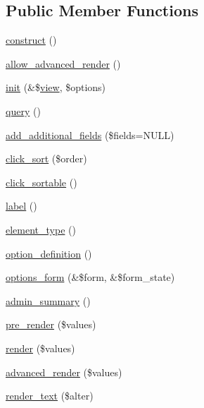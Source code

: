 \subsection*{Public Member Functions}
\begin{CompactItemize}
\item 
\hyperlink{classviews__handler__field_3d50050864c255b71c842972a45d39f6}{construct} ()
\item 
\hyperlink{classviews__handler__field_cdeb45612be43c2d58814726b35e55aa}{allow\_\-advanced\_\-render} ()
\item 
\hyperlink{classviews__handler__field_7eaaf0fd6fbc57c2955f88b257394d19}{init} (\&\$\hyperlink{classview}{view}, \$options)
\item 
\hyperlink{classviews__handler__field_4f661f91bcbe80d4a00c30a31456c502}{query} ()
\item 
\hyperlink{classviews__handler__field_1590869371ef24a211e591a07ed5f7cb}{add\_\-additional\_\-fields} (\$fields=NULL)
\item 
\hyperlink{classviews__handler__field_1c8cabe835ba05ed045c8f6eec6a36b8}{click\_\-sort} (\$order)
\item 
\hyperlink{classviews__handler__field_22ef16d2b34823a3d12f273d34278b00}{click\_\-sortable} ()
\item 
\hyperlink{classviews__handler__field_57c9be8a5a6a5f447c0320bf1a5378ee}{label} ()
\item 
\hyperlink{classviews__handler__field_dc0ac73a91e5bfb8da464b3a804a7aa9}{element\_\-type} ()
\item 
\hyperlink{classviews__handler__field_64c69a8a3697603f8283405071c25b76}{option\_\-definition} ()
\item 
\hyperlink{classviews__handler__field_0435d161922b7b4b84f02a2e79bb947a}{options\_\-form} (\&\$form, \&\$form\_\-state)
\item 
\hyperlink{classviews__handler__field_984d6ce9f6401260fca2d4673b27ae76}{admin\_\-summary} ()
\item 
\hyperlink{classviews__handler__field_e30a1d9c98c62ae40c90b938e09cd0ec}{pre\_\-render} (\$values)
\item 
\hyperlink{classviews__handler__field_82ff951c5e9ceb97b2eab86f880cbc1e}{render} (\$values)
\item 
\hyperlink{classviews__handler__field_eaf2c6f1ad7afa813ba64de4be3ecd58}{advanced\_\-render} (\$values)
\item 
\hyperlink{classviews__handler__field_1d6e3f832a9a22410029e79cd9cfc32e}{render\_\-text} (\$alter)
\item 

\end{CompactItemize}

